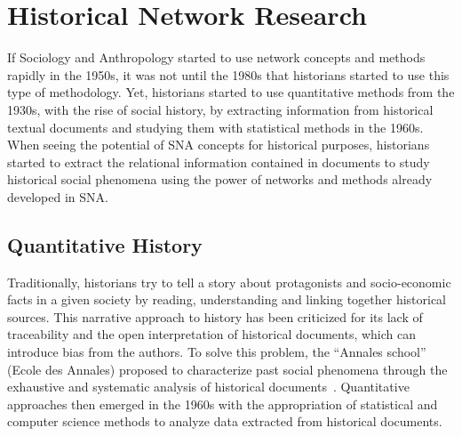 \section{Historical Network Research}

If Sociology and Anthropology started to use network concepts and methods rapidly in the 1950s, it was not until the 1980s that historians started to use this type of methodology.
Yet, historians started to use quantitative methods from the 1930s, with the rise of social history, by extracting information from historical textual documents and studying them with statistical methods in the 1960s.
When seeing the potential of SNA concepts for historical purposes, historians started to extract the relational information contained in documents to study historical social phenomena using the power of networks and methods already developed in SNA.

\subsection{Quantitative History}


Traditionally, historians try to tell a story about protagonists and socio-economic facts in a given society by reading, understanding and linking together historical sources.
This narrative approach to history has been criticized for its lack of traceability and the open interpretation of historical documents, which can introduce bias from the authors.
To solve this problem, the ``Annales school'' (Ecole des Annales) proposed to characterize past social phenomena through the exhaustive and systematic analysis of historical documents~\cite{prost2014}.
Quantitative approaches then emerged in the 1960s with the appropriation of statistical and computer science methods to analyze data extracted from historical documents.

